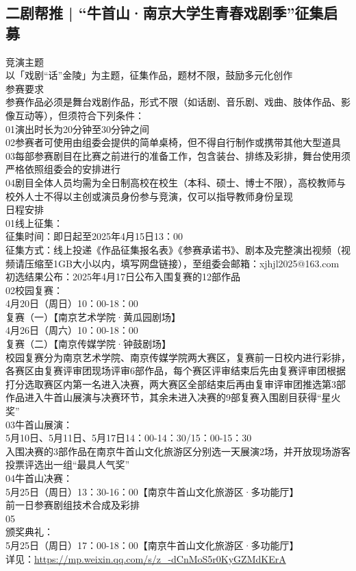 \documentclass[letterpaper, 12pt]{article}
\begin{document}
\begin{multicols}{2}
\subsection{二剧帮推 | “牛首山·南京大学生青春戏剧季”征集启募}
竞演主题
\\以「戏剧“话”金陵」为主题，征集作品，题材不限，鼓励多元化创作
\\参赛要求
\\参赛作品必须是舞台戏剧作品，形式不限（如话剧、音乐剧、戏曲、肢体作品、影像互动等），但须符合下列条件：
\\01演出时长为20分钟至30分钟之间
\\02参赛者可使用由组委会提供的简单桌椅，但不得自行制作或携带其他大型道具
\\03每部参赛剧目在比赛之前进行的准备工作，包含装台、排练及彩排，舞台使用须严格依照组委会的安排进行
\\04剧目全体人员均需为全日制高校在校生（本科、硕士、博士不限），高校教师与校外人士不得以主创或演员身份参与竞演，仅可以指导教师身份呈现
\\日程安排
\\01线上征集：
\\征集时间：即日起至2025年4月15日13：00
\\征集方式：线上投递《作品征集报名表》《参赛承诺书》、剧本及完整演出视频（视频请压缩至1GB大小以内，填写网盘链接），至组委会邮箱：xjhjl2025@163.com
\\初选结果公布：2025年4月17日公布入围复赛的12部作品
\\02校园复赛：
\\4月20日（周日）10：00-18：00
\\复赛（一）【南京艺术学院·黄瓜园剧场】
\\4月26日（周六）10：00-18：00
\\复赛（二）【南京传媒学院·钟鼓剧场】
\\校园复赛分为南京艺术学院、南京传媒学院两大赛区，复赛前一日校内进行彩排，各赛区由复赛评审团现场评审6部作品，每个赛区评审结束后先由复赛评审团根据打分选取赛区内第一名进入决赛，两大赛区全部结束后再由复审评审团推选第3部作品进入牛首山展演与决赛环节，其余未进入决赛的9部复赛入围剧目获得“星火奖”
\\03牛首山展演：
\\5月10日、5月11日、5月17日14：00-14：30/15：00-15：30
\\入围决赛的3部作品在南京牛首山文化旅游区分别选一天展演2场，并开放现场游客投票评选出一组“最具人气奖”
\\04牛首山决赛：
\\5月25日（周日）13：30-16：00【南京牛首山文化旅游区·多功能厅】
\\前一日参赛剧组技术合成及彩排
\\05
\\颁奖典礼：
\\   5月25日（周日）17：00-18：00【南京牛首山文化旅游区·多功能厅】
\\详见：\url{https://mp.weixin.qq.com/s/z_-dCnMoS5r0KyGZMdKErA}


\end{multicols}
\end{document}
